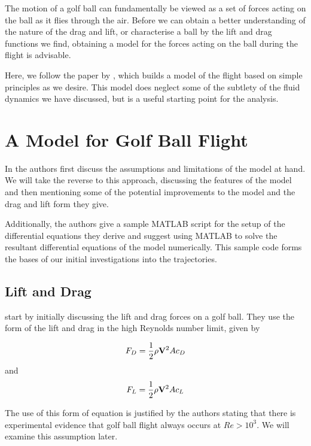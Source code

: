 The motion of a golf ball can fundamentally be viewed as a set of forces acting on the ball as it
flies through the air. Before we can obtain a better understanding of the nature of the drag and lift,
or characterise a ball by the lift and drag functions we find,
obtaining a model for the forces acting on the ball during the flight is advisable. 

Here, we follow the paper by \citet{Robinson2013}, which builds a model of the flight based on simple principles as
we desire. This model does neglect some of the subtlety of the fluid dynamics we have discussed,
but is a useful starting point for the analysis.

\section{A Model for Golf Ball Flight}

In \citet{Robinson2013} the authors first discuss the assumptions and limitations of the model at hand.
We will take the reverse to this approach, discussing the features of the model and then mentioning
some of the potential improvements to the model and the drag and lift form they give.

Additionally, the authors give a sample MATLAB script for the setup of the differential equations they
derive and suggest using MATLAB to solve the resultant differential equations of the model numerically. 
This sample code forms the bases of our initial investigations into the trajectories.

\subsection{Lift and Drag}

\citeauthor*{Robinson2013} start by initially discussing the lift and drag forces on a golf ball.
They use the form of the lift and drag in the high Reynolds number limit, given by

\begin{equation} \nonumber
F_{D} = \frac{1}{2} \rho \mathbf{V}^2 A c_{D}
\end{equation}
and
\begin{equation} \nonumber
F_{L} = \frac{1}{2} \rho \mathbf{V}^2 A c_{L}
\end{equation}

The use of this form of equation is justified by the authors stating that there is experimental evidence
that golf ball flight always occurs at $Re > 10^3$. We will examine this assumption later.

